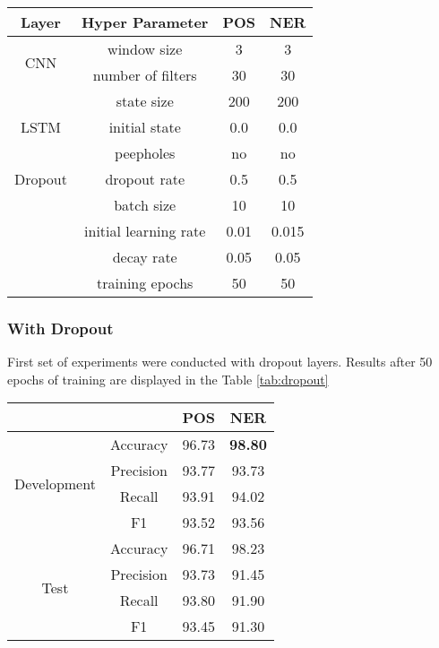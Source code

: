 \begin{center}
\begin{tabular}{ |c|c|c|c| }
\hline
\textbf{Layer} & \textbf{Hyper Parameter} & \textbf{POS} & \textbf{NER} \\ \hline
\multirow{2}{*}{CNN} & window size & 3 & 3 \\
 & number of filters & 30 & 30 \\ \hline
\multirow{3}{*}{LSTM} & state size & 200 & 200 \\
 & initial state & 0.0 & 0.0 \\
 & peepholes & no & no \\ \hline
Dropout & dropout rate & 0.5 & 0.5 \\ \hline
\multirow{2}{*}{} & batch size & 10 & 10\\
 & initial learning rate & 0.01 & 0.015 \\
 & decay rate & 0.05 & 0.05 \\
 & training epochs & 50 & 50 \\
\hline
\end{tabular}
\label{tab:hyper}
\end{center}

\label{no_dropout}
\subsubsection{With Dropout}
First set of experiments were conducted with dropout layers. Results after 50
epochs of training are displayed in the Table \ref{tab:dropout}

\begin{center}
\begin{tabular}{ |c|c|c|c| }
\hline
&  & {\textbf{POS}} & {\textbf{NER}}\\ \hline
\multirow{4}{*}{Development} & Accuracy & 96.73 & \textbf{98.80} \\
 & Precision & 93.77 & 93.73 \\
 & Recall & 93.91 & 94.02 \\
 & F1 & 93.52 & 93.56 \\ \hline
\multirow{4}{*}{Test} & Accuracy & 96.71 & 98.23 \\
 & Precision & 93.73 & 91.45 \\
 & Recall & 93.80 & 91.90 \\
 & F1 & 93.45 & 91.30 \\ \hline
\end{tabular}
\label{tab:dropout}
\end{center}


